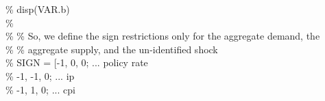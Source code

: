 \hspace{1mm}\hspace{5mm} \hspace{5mm} \hspace{5mm} \hspace{5mm} \textcolor{matlabgreen}{\% disp(VAR.b) }\\ 
\hspace{1mm}\hspace{5mm} \hspace{5mm} \hspace{5mm} \hspace{5mm} \textcolor{matlabgreen}{\%  }\\ 
\hspace{1mm}\hspace{5mm} \hspace{5mm} \hspace{5mm} \hspace{5mm} \textcolor{matlabgreen}{\% }\textcolor{matlabgreen}{\% So, we define the sign restrictions only \textcolor{matlabblue}{for} the aggregate demand, the  }\\ 
\hspace{1mm}\hspace{5mm} \hspace{5mm} \hspace{5mm} \hspace{5mm} \hspace{5mm} \textcolor{matlabgreen}{\% }\textcolor{matlabgreen}{\% aggregate supply, and the un-identified shock }\\ 
\hspace{1mm}\hspace{5mm} \hspace{5mm} \hspace{5mm} \hspace{5mm} \hspace{5mm} \textcolor{matlabgreen}{\% SIGN = [-1,       0,      0;        ... policy rate }\\ 
\hspace{1mm}\hspace{5mm} \hspace{5mm} \hspace{5mm} \hspace{5mm} \hspace{5mm} \textcolor{matlabgreen}{\%         -1,      -1,      0;        ... ip         }\\ 
\hspace{1mm}\hspace{5mm} \hspace{5mm} \hspace{5mm} \hspace{5mm} \hspace{5mm} \textcolor{matlabgreen}{\%         -1,       1,      0;        ... cpi }\\ 
